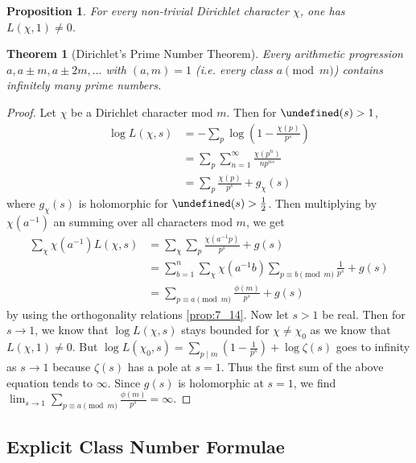 \documentclass[11pt]{article}
\theoremstyle{definition}
\theoremstyle{plain}
\newtheorem{theorem}[definition]{Theorem}
\newtheorem{proposition}[definition]{Proposition}
\theoremstyle{remark}
\let\Re\undefined
\DeclareMathOperator{\Re}{Re}
\begin{document}
\begin{proposition}\label{prop:7_18}
    For every non-trivial Dirichlet character $\chi$, one has $L(\chi, 1) \neq 0$.
\end{proposition}

\begin{theorem}[Dirichlet's Prime Number Theorem]\label{thm:7_19}
    Every arithmetic progression $a, a \pm m, a \pm 2m, \ldots$ with $(a, m) = 1$ (i.e. every class $a \pmod{m}$) contains infinitely many prime numbers.
\end{theorem}
\begin{proof}
    Let $\chi$ be a Dirichlet character mod $m$. Then for $\Re(s) > 1$,
    \begin{align*}
        \log L(\chi, s)
        &= -\sum_{p}\log\left(1 - \frac{\chi(p)}{p^s}\right)\\
        &= \sum_p \sum_{n=1}^\infty \frac{\chi(p^n)}{n p^{ns}}\\
        &= \sum_p \frac{\chi(p)}{p^s} + g_\chi(s)
    \end{align*}
    where $g_\chi(s)$ is holomorphic for $\Re(s) > \frac{1}{2}$. Then multiplying by $\chi(a^{-1})$ an summing over all characters mod $m$, we get
    \begin{align*}
        \sum_{\chi} \chi(a^{-1}) L(\chi, s)
        &= \sum_\chi \sum_p \frac{\chi(a^{-1} p)}{p^s} + g(s)\\
        &= \sum_{b=1}^n \sum_\chi \chi(a^{-1}b)\sum_{p \equiv b \pmod{m}} \frac{1}{p^s} + g(s)\\
        &= \sum_{p \equiv a \pmod{m}} \frac{\phi(m)}{p^s} + g(s)
    \end{align*}
    by using the orthogonality relations \autoref{prop:7_14}. Now let $s > 1$ be real. Then for $s \to 1$, we know that $\log L(\chi, s)$ stays bounded for $\chi \neq \chi_0$ as we know that $L(\chi, 1) \neq 0$. But $\log L(\chi_0, s)  = \sum_{p \mid m} \left(1 - \frac{1}{p^s}\right) + \log \zeta(s)$ goes to infinity as $s \to 1$ because $\zeta(s)$ has a pole at $s = 1$. Thus the first sum of the above equation tends to $\infty$. Since $g(s)$ is holomorphic at $s = 1$, we find $\lim_{s \to 1} \sum_{p \equiv a \pmod{m}} \frac{\phi(m)}{p^s} = \infty$.
\end{proof}

\subsection{Explicit Class Number Formulae}
\end{document}
